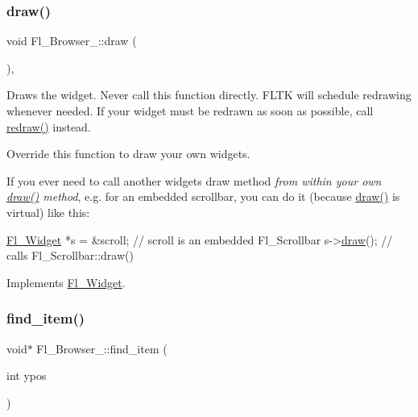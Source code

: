 \subsubsection{\texorpdfstring{draw()}{draw()}}
{\footnotesize\ttfamily void Fl\+\_\+\+Browser\+\_\+\+::draw (\begin{DoxyParamCaption}{ }\end{DoxyParamCaption})\hspace{0.3cm}{\ttfamily [protected]}, {\ttfamily [virtual]}}

Draws the widget. Never call this function directly. F\+L\+TK will schedule redrawing whenever needed. If your widget must be redrawn as soon as possible, call \hyperlink{class_fl___widget_aa63ce68cbf4620cf8750b868368ea02b}{redraw()} instead.

Override this function to draw your own widgets.

If you ever need to call another widget\textquotesingle{}s draw method {\itshape from within your own \hyperlink{class_fl___browser___af563481285289e2fc304ded1a0cbb49f}{draw()} method}, e.\+g. for an embedded scrollbar, you can do it (because \hyperlink{class_fl___browser___af563481285289e2fc304ded1a0cbb49f}{draw()} is virtual) like this\+:


\begin{DoxyCode}
    \hyperlink{class_fl___widget}{Fl\_Widget} *s = &scroll;     \textcolor{comment}{// scroll is an embedded Fl\_Scrollbar}
s->\hyperlink{class_fl___widget_a1acb38c6b3cb40452ad02ccfeedbac8a}{draw}();          \textcolor{comment}{// calls Fl\_Scrollbar::draw()}
\end{DoxyCode}
 

Implements \hyperlink{class_fl___widget_a1acb38c6b3cb40452ad02ccfeedbac8a}{Fl\+\_\+\+Widget}.

\mbox{\label{class_fl___browser___a259e5042e07cae2f63884497affe562a}} 
\subsubsection{\texorpdfstring{find\+\_\+item()}{find\_item()}}
{\footnotesize\ttfamily void$\ast$ Fl\+\_\+\+Browser\+\_\+\+::find\+\_\+item (\begin{DoxyParamCaption}\item[{int}]{ypos }\end{DoxyParamCaption})\hspace{0.3cm}{\ttfamily [protected]}}

